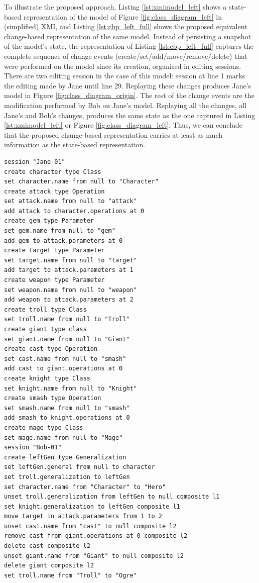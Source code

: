 To illustrate the proposed approach, Listing \ref{lst:xmimodel_left} shows a state-based representation of the model of Figure \ref{fig:class_diagram_left} in (simplified) XMI, and Listing \ref{lst:cbp_left_full} shows the proposed equivalent change-based representation of the same model. Instead of persisting a snapshot of the model's state, the representation of Listing \ref{lst:cbp_left_full} captures the complete sequence of change events (create/set/add/move/remove/delete) that were performed on the model since its creation, organised in editing sessions. There are two editing session in the case of this model: session at line 1 marks the editing made by Jane until line 29. Replaying these changes produces Jane's model in Figure \ref{fig:class_diagram_origin}. The rest of the change events are the modification performed by Bob on Jane's model. Replaying all the changes, all Jane's and Bob's changes, produces the same state as the one captured in Listing \ref{lst:xmimodel_left} or Figure \ref{fig:class_diagram_left}. Thus, we can conclude that the proposed change-based representation carries at least as much information as the state-based representation. 

\vspace{-20pt}
\begin{lstlisting}[style=eol,escapechar=|,caption={The complete change events of Bob's model in Figure \ref{fig:class_diagram_left}.},label=lst:cbp_left_full]
session "Jane-01"
create character type Class
set character.name from null to "Character" 
create attack type Operation
set attack.name from null to "attack" 
add attack to character.operations at 0
create gem type Parameter
set gem.name from null to "gem" 
add gem to attack.parameters at 0
create target type Parameter
set target.name from null to "target" 
add target to attack.parameters at 1
create weapon type Parameter
set weapon.name from null to "weapon" 
add weapon to attack.parameters at 2
create troll type Class
set troll.name from null to "Troll" 
create giant type class
set giant.name from null to "Giant"
create cast type Operation
set cast.name from null to "smash"
add cast to giant.operations at 0
create knight type Class
set knight.name from null to "Knight"
create smash type Operation
set smash.name from null to "smash"
add smash to knight.operations at 0
create mage type Class
set mage.name from null to "Mage" 
session "Bob-01"
create leftGen type Generalization
set leftGen.general from null to character
set troll.generalization to leftGen
set character.name from "Character" to "Hero"
unset troll.generalization from leftGen to null composite l1
set knight.generalization to leftGen composite l1
move target in attack.parameters from 1 to 2
unset cast.name from "cast" to null composite l2
remove cast from giant.operations at 0 composite l2
delete cast composite l2
unset giant.name from "Giant" to null composite l2
delete giant composite l2
set troll.name from "Troll" to "Ogre"
\end{lstlisting}

